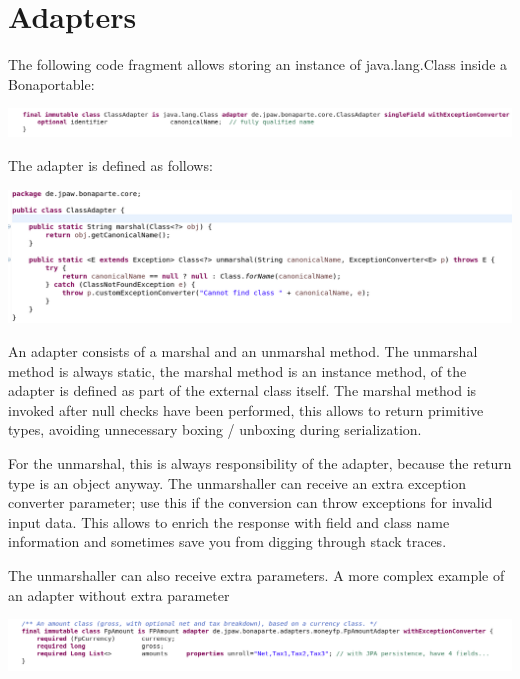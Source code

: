 \documentclass[11pt,a4paper,oneside]{article}
\begin{document}
\section{Adapters}
The following code fragment allows storing an instance of {\ttfamily java.lang.Class} inside a Bonaportable:

\vspace{2mm}

\hspace{1cm}\includegraphics[scale=0.5]{images/tut1-adapter1.png}

The adapter is defined as follows:

\vspace{2mm}

\hspace{1cm}\includegraphics[scale=0.5]{images/tut1-adapter2.png}

An adapter consists of a {\ttfamily marshal} and an {\ttfamily unmarshal} method. The unmarshal method is always static, the
marshal method is an instance method, of the adapter is defined as part of the external class itself.
The marshal method is invoked after null checks have been performed, this allows to return primitive types, avoiding
unnecessary boxing / unboxing during serialization.

For the unmarshal, this is always responsibility of the adapter, because the return type is an object anyway.
The unmarshaller can receive an extra exception converter parameter; use this if the conversion can throw exceptions for invalid
input data. This allows to enrich the response with field and class name information and sometimes save you from digging
through stack traces.

The unmarshaller can also receive extra parameters. A more complex example of an adapter without extra parameter

\vspace{2mm}

\hspace{1cm}\includegraphics[scale=0.5]{images/tut1-adapter3.png}
\end{document}
